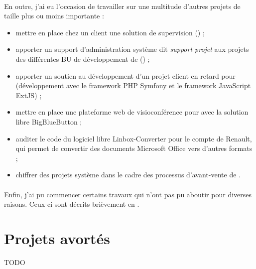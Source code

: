 \paragraph{}
En outre, j'ai eu l'occasion de travailler sur une multitude d'autres projets de taille plus ou moins importante :

\begin{itemize}
	\item mettre en place chez un client une solution de supervision \acentreon{} () ;
	\item apporter un support d'administration système dit \emph{support projet} aux projets des différentes BU de développement de \asmile{} () ;
	\item apporter un soutien au développement d'un projet client en retard pour \abt{} (développement avec le framework PHP Symfony et le framework JavaScript ExtJS) ;
	\item mettre en place une plateforme web de visioconférence pour \asmile{} avec la solution libre BigBlueButton ;
	\item auditer le code du logiciel libre Linbox-Converter pour le compte de Renault, qui permet de convertir des documents Microsoft Office vers d'autres formats ;
	\item chiffrer des projets système dans le cadre des processus d'avant-vente de \asmile.
\end{itemize}

\paragraph{}
Enfin, j'ai pu commencer certains travaux qui n'ont pas pu aboutir pour diverses raisons.
Ceux-ci sont décrits brièvement en .



\section{Projets avortés}
\label{section:avortes}

TODO

